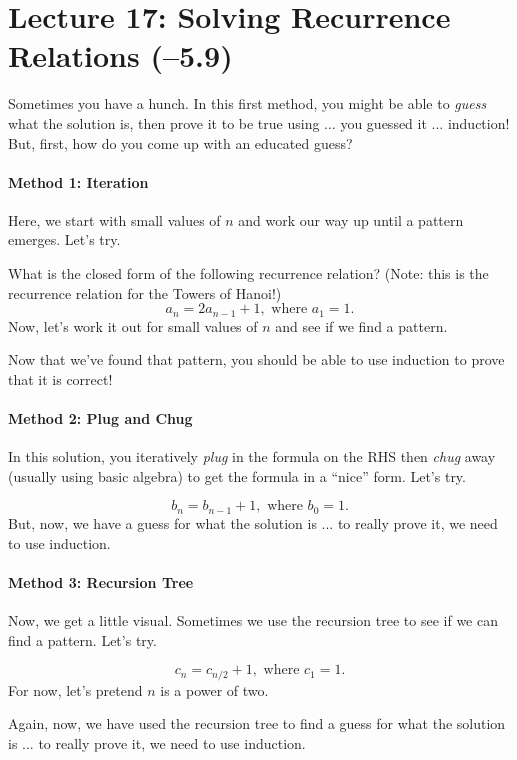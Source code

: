 \section*{Lecture 17: Solving Recurrence Relations (--5.9)}

Sometimes you have a hunch.  In this first
method, you might be able to \emph{guess} what the solution is, then prove it to
be true using ... you guessed it ... induction!  But, first, how do you come up
with an educated guess?

\paragraph{Method 1: Iteration} Here, we start with small values of $n$ and work
our way up until a pattern emerges. Let's try.

What is the closed form of the following recurrence relation?
(Note: this is the recurrence relation for the Towers of Hanoi!)
$$
    a_n = 2 a_{n-1} + 1, \text{ where } a_1=1.
$$
Now, let's work it out for small values of $n$ and see if we find a pattern.
\practice

Now that we've found that pattern, you should be able to use induction to prove
that it is correct!

\paragraph{Method 2: Plug and Chug} In this solution, you iteratively
\emph{plug} in the formula on the RHS then \emph{chug} away (usually using basic
algebra) to get the formula in a ``nice'' form.  Let's try.

$$
    b_n = b_{n-1} + 1, \text{ where } b_0=1.
$$
\practice
But, now, we have a guess for what the solution is ... to really prove it, we
need to use induction.

\pagebreak
\paragraph{Method 3: Recursion Tree} Now, we get a little visual.  Sometimes we
use the recursion tree to see if we can find a pattern.  Let's try.

$$
    c_n = c_{n/2} + 1, \text{ where } c_1=1.
$$
For now, let's pretend $n$ is a power of two.
\practice \vspace{1in}

Again, now, we have used the recursion tree to find
a guess for what the solution is ... to really prove it, we
need to use induction.

